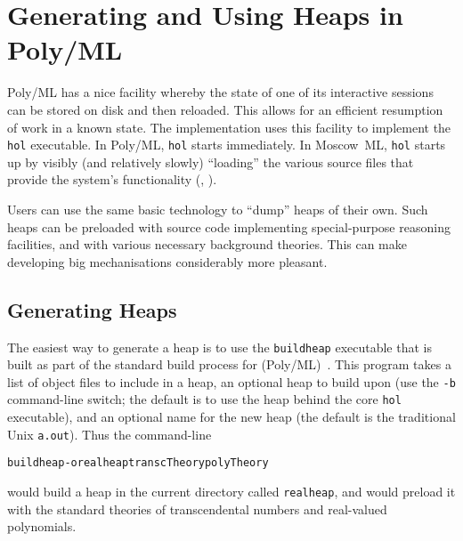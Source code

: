 

\section{Generating and Using Heaps in Poly/ML \HOL{}}
\label{sec:polyml-heaps}

Poly/ML has a nice facility whereby the state of one of its interactive sessions can be stored on disk and then reloaded.
This allows for an efficient resumption of work in a known state.
The \HOL{} implementation uses this facility to implement the \texttt{hol} executable.
In Poly/ML, \texttt{hol} starts immediately.
In Moscow~ML, \texttt{hol} starts up by visibly (and relatively slowly) ``loading'' the various source files that provide the system's functionality (\eg, ).

Users can use the same basic technology to ``dump'' heaps of their own.
Such heaps can be preloaded with source code implementing special-purpose reasoning facilities, and with various necessary background theories.
This can make developing big mechanisations considerably more pleasant.

\subsection{Generating \HOL{} Heaps}

The easiest way to generate a \HOL{} heap is to use the \texttt{buildheap} executable that is built as part of the standard build process for (Poly/ML)~\HOL.
This program takes a list of object files to include in a heap, an optional heap to build upon (use the \texttt{-b} command-line switch; the default is to use the heap behind the core \texttt{hol} executable), and an optional name for the new heap (the default is the traditional Unix \texttt{a.out}).
Thus the command-line
\begin{alltt}
   buildheap -o realheap transcTheory polyTheory
\end{alltt}
would build a heap in the current directory called \texttt{realheap}, and would preload it with the standard theories of transcendental numbers and real-valued polynomials.

